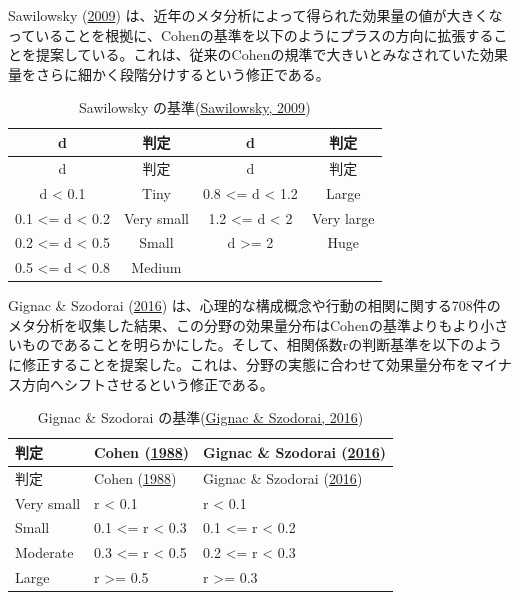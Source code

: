 \documentclass[
  ja=standard, xelatex, base=12pt]{bxjsreport}
\begin{document}
Sawilowsky (\protect\hyperlink{ref-sawilowsky2009}{2009}) は、近年のメタ分析によって得られた効果量の値が大きくなっていることを根拠に、Cohenの基準を以下のようにプラスの方向に拡張することを提案している。これは、従来のCohenの規準で大きいとみなされていた効果量をさらに細かく段階分けするという修正である。

\begin{longtable}[]{@{}cccc@{}}
\caption{Sawilowsky の基準(\protect\hyperlink{ref-sawilowsky2009}{Sawilowsky, 2009})}\tabularnewline
\toprule
d & 判定 & d & 判定 \\
\midrule
\endfirsthead
\toprule
d & 判定 & d & 判定 \\
\midrule
\endhead
d \textless{} 0.1 & Tiny & 0.8 \textless= d \textless{} 1.2 & Large \\
0.1 \textless= d \textless{} 0.2 & Very small & 1.2 \textless= d \textless{} 2 & Very large \\
0.2 \textless= d \textless{} 0.5 & Small & d \textgreater= 2 & Huge \\
0.5 \textless= d \textless{} 0.8 & Medium & & \\
\bottomrule
\end{longtable}

Gignac \& Szodorai (\protect\hyperlink{ref-gignac2016}{2016}) は、心理的な構成概念や行動の相関に関する708件のメタ分析を収集した結果、この分野の効果量分布はCohenの基準よりもより小さいものであることを明らかにした。そして、相関係数rの判断基準を以下のように修正することを提案した。これは、分野の実態に合わせて効果量分布をマイナス方向へシフトさせるという修正である。

\begin{longtable}[]{@{}lll@{}}
\caption{Gignac \& Szodorai の基準(\protect\hyperlink{ref-gignac2016}{Gignac \& Szodorai, 2016})}\tabularnewline
\toprule
判定 & Cohen (\protect\hyperlink{ref-cohen1988}{1988}) & Gignac \& Szodorai (\protect\hyperlink{ref-gignac2016}{2016}) \\
\midrule
\endfirsthead
\toprule
判定 & Cohen (\protect\hyperlink{ref-cohen1988}{1988}) & Gignac \& Szodorai (\protect\hyperlink{ref-gignac2016}{2016}) \\
\midrule
\endhead
Very small & r \textless{} 0.1 & r \textless{} 0.1 \\
Small & 0.1 \textless= r \textless{} 0.3 & 0.1 \textless= r \textless{} 0.2 \\
Moderate & 0.3 \textless= r \textless{} 0.5 & 0.2 \textless= r \textless{} 0.3 \\
Large & r \textgreater= 0.5 & r \textgreater= 0.3 \\
\bottomrule
\end{longtable}
\end{document}
